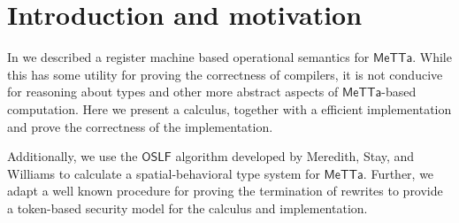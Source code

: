 \section{Introduction and motivation}

In \cite{arxiv:meta-metta-opsem:meredith} we described a register
machine based operational semantics for $\mathsf{MeTTa}$. While this
has some utility for proving the correctness of compilers, it is not
conducive for reasoning about types and other more abstract aspects of
$\mathsf{MeTTa}$-based computation. Here we present a calculus,
together with a efficient implementation and prove the correctness of
the implementation.

Additionally, we use the $\mathsf{OSLF}$ algorithm developed by
Meredith, Stay, and Williams to calculate a spatial-behavioral type
system for $\mathsf{MeTTa}$. Further, we adapt a well known procedure
for proving the termination of rewrites to provide a token-based
security model for the calculus and implementation.
